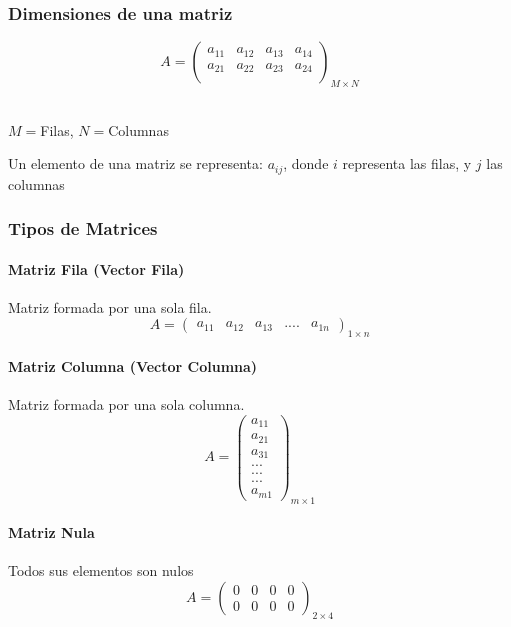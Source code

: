 \documentclass[stu, 12pt, letterpaper, donotrepeattitle, floatsintext, natbib]{apa7}
\begin{document}
\subsubsection{Dimensiones de una matriz}
$$
A=\begin{pmatrix}
a_{11} & a_{12} & a_{13} & a_{14}\\
a_{21} & a_{22} & a_{23} & a_{24}\\
\end{pmatrix}_{M\times N}
$$\\
\begin{small}
\begin{center}
$M= $Filas, $N= $Columnas
\end{center}
\end{small}

Un elemento de una matriz se representa: {\Large $a_{ij}$}, donde {\Large $i$} representa las filas, y {\Large $j$} las columnas\\

\subsubsection{Tipos de Matrices}
\paragraph{Matriz Fila (Vector Fila)}
Matriz formada por una sola fila.
$$A=\begin{pmatrix} a_{11} & a_{12} & a_{13} & .... & a_{1n} \end{pmatrix}_{1\times n}$$
\paragraph{Matriz Columna (Vector Columna)}
Matriz formada por una sola columna.
$$A=\begin{pmatrix} a_{11} \\ a_{21} \\ a_{31} \\ ... \\ ... \\ ... \\ a_{m1}\end{pmatrix}_{m\times1}$$
\paragraph{Matriz Nula}
Todos sus elementos son nulos
$$A=\begin{pmatrix} 0 & 0 & 0 & 0 \\ 0 & 0 & 0 & 0 \end{pmatrix}_{2\times4}$$
\end{document}
